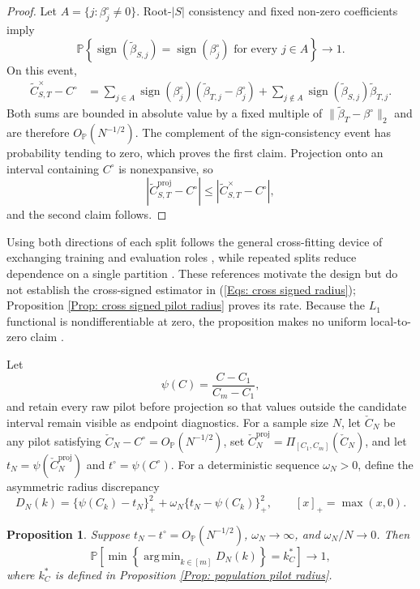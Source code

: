 \documentclass[12pt]{article}
\DeclareMathOperator*{\argmin}{arg\,min}
\newenvironment{bluechange}{\begingroup\color[rgb]{0.00,0.00,1.00}}{\endgroup}
\newtheorem{proposition}{Proposition}
\theoremstyle{remark}
\theoremstyle{plain}
\begin{document}
\begin{bluechange}
\begin{proof}
Let $A=\{j:\beta_j^\circ\ne0\}$. Root-$|S|$ consistency and fixed non-zero coefficients imply
\[
\mathbb P\!\left\{
\operatorname{sign}(\widetilde\beta_{S,j})
=\operatorname{sign}(\beta_j^\circ)
\text{ for every }j\in A
\right\}\longrightarrow1.
\]
On this event,
\begin{align*}
\widetilde C_{S,T}^{\times}-C^\circ
&=\sum_{j\in A}\operatorname{sign}(\beta_j^\circ)
(\widetilde\beta_{T,j}-\beta_j^\circ)
+\sum_{j\notin A}\operatorname{sign}(\widetilde\beta_{S,j})
\widetilde\beta_{T,j}.
\end{align*}
Both sums are bounded in absolute value by a fixed multiple of
$\|\widetilde\beta_T-\beta^\circ\|_2$ and are therefore
$O_{\mathbb P}(N^{-1/2})$. The complement of the sign-consistency event has probability tending to zero, which proves the first claim. Projection onto an interval containing $C^\circ$ is nonexpansive, so
\[
|\widetilde C_{S,T}^{\mathrm{proj}}-C^\circ|
\le |\widetilde C_{S,T}^{\times}-C^\circ|,
\]
and the second claim follows.
\end{proof}

Using both directions of each split follows the general cross-fitting device of exchanging training and evaluation roles \citep{ChernozhukovEtAl2018DML}, while repeated splits reduce dependence on a single partition \citep{MeinshausenEtAl2009}. These references motivate the design but do not establish the cross-signed estimator in (\ref{Eqs: cross signed radius}); Proposition \ref{Prop: cross signed pilot radius} proves its rate. Because the $L_1$ functional is nondifferentiable at zero, the proposition makes no uniform local-to-zero claim \citep{HiranoPorter2012}.

Let
\[
\psi(C)=\frac{C-C_1}{C_m-C_1},
\]
and retain every raw pilot before projection so that values outside the candidate interval remain visible as endpoint diagnostics. For a sample size $N$, let $\check C_N$ be any pilot satisfying $\check C_N-C^\circ=O_{\mathbb P}(N^{-1/2})$, set $\check C_N^{\mathrm{proj}}=\Pi_{[C_1,C_m]}(\check C_N)$, and let $t_N=\psi(\check C_N^{\mathrm{proj}})$ and $t^\circ=\psi(C^\circ)$. For a deterministic sequence $\omega_N>0$, define the asymmetric radius discrepancy
\begin{equation}\label{Eqs: direct pilot discrepancy}
D_N(k)
=\{\psi(C_k)-t_N\}_+^2
+\omega_N\{t_N-\psi(C_k)\}_+^2,
\qquad [x]_+=\max(x,0).
\end{equation}

\begin{proposition}\label{Prop: asymmetric pilot target}
Suppose $t_N-t^\circ=O_{\mathbb P}(N^{-1/2})$, $\omega_N\to\infty$, and $\omega_N/N\to0$. Then
\[
\mathbb P\left[
\min\left\{\argmin_{k\in[m]}D_N(k)\right\}=k_C^*
\right]\longrightarrow1,
\]
where $k_C^*$ is defined in Proposition \ref{Prop: population pilot radius}.
\end{proposition}



\end{bluechange}
\end{document}
